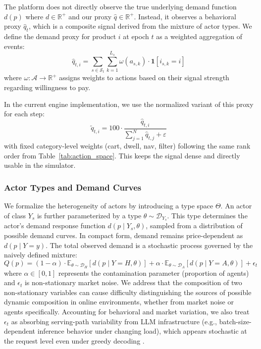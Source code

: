 The platform does not directly observe the true underlying demand function $d(p)$ where $d \in \mathbb{R}^{+}$ and our proxy $\hat{q} \in \mathbb{R}^{+}$. Instead, it observes a behavioral proxy $\hat{q}_t$, which is a composite signal derived from the mixture of actor types. We define the demand proxy for product $i$ at epoch $t$ as a weighted aggregation of events:
\begin{equation}
\label{eq:qhat}
\hat{q}_{t,i} = \sum_{s \in \mathcal{S}_t} \sum_{k=1}^{L_s} \omega(a_{s,k}) \cdot \mathbf{1}[i_{s,k} = i]
\end{equation}
where $\omega: \mathcal{A} \to \mathbb{R}^+$ assigns weights to actions based on their signal strength regarding willingness to pay.

In the current engine implementation, we use the normalized variant of this proxy for each step:
\begin{equation}
\tilde q_{t,i} = 100 \cdot \frac{\hat q_{t,i}}{\sum_{j=1}^{N}\hat q_{t,j} + \varepsilon}
\end{equation}
with fixed category-level weights (cart, dwell, nav, filter) following the same rank order from Table~\ref{tab:action_space}. This keeps the signal dense and directly usable in the simulator.

\subsubsection{Actor Types and Demand Curves}
We formalize the heterogeneity of actors by introducing a type space $\Theta$. An actor of class $Y_s$ is further parameterized by a type $\theta \sim \mathcal{D}_{Y_s}$. This type determines the actor's demand response function $d\!\left(p \mid Y_s,\theta\right)$, sampled from a distribution of possible demand curves. In compact form, demand remains price-dependent as $d(p\mid Y=y)$. The total observed demand is a stochastic process governed by the naively defined mixture:
\begin{equation}
\label{eq:mixture_demand}
Q(p) = (1-\alpha) \cdot \mathbb{E}_{\theta \sim \mathcal{D}_H}[d(p\mid Y=H,\theta)] + \alpha \cdot \mathbb{E}_{\theta \sim \mathcal{D}_A}[d(p\mid Y=A,\theta)] + \epsilon_t
\end{equation}
where $\alpha \in [0, 1]$ represents the contamination parameter (proportion of agents) and $\epsilon_t$ is non-stationary market noise.
We address that the composition of two non-stationary variables can cause difficulty distinguishing the sources of possible dynamic composition in online environments, whether from market noise or agents specifically.
Accounting for behavioral and market variation, we also treat $\epsilon_t$ as absorbing serving-path variability from LLM infrastructure (e.g., batch-size-dependent inference behavior under changing load), which appears stochastic at the request level even under greedy decoding \parencite{horace_he_and_thinking_machines_lab_defeating_2025}.



